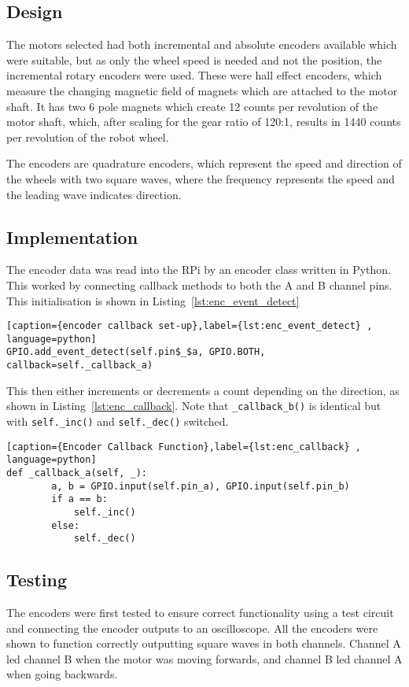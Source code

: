 \subsection{Design}\label{elec/encoder/design}
The motors selected had both incremental and absolute
encoders available which were suitable, but as only the wheel speed is needed and not the position,
the incremental rotary encoders were used. These were hall effect
encoders, which measure the changing magnetic field of magnets which
are attached to the motor shaft. It has two 6 pole magnets
which create 12 counts per revolution of the motor shaft, which, after
scaling for the gear ratio of 120:1, results in 1440 counts per
revolution of the robot wheel.

The encoders are quadrature encoders, which represent the speed and
direction of the wheels with two square waves, where the frequency
represents the speed and the leading wave indicates direction.

\subsection{Implementation}\label{elec/encoder/impl}

The encoder data was read into the RPi by an encoder class written in
Python. This worked by connecting callback methods to both the A and B
channel pins. This initialisation is shown in Listing~\ref{lst:enc_event_detect}

\begin{lstlisting}[caption={encoder callback set-up},label={lst:enc_event_detect} , language=python]
GPIO.add_event_detect(self.pin$_$a, GPIO.BOTH, callback=self._callback_a)
\end{lstlisting}

This then either increments or decrements a count depending on the
direction, as shown in Listing~\ref{lst:enc_callback}. Note that
\verb|_callback_b()| is identical but with \verb|self._inc()| and
\verb|self._dec()| switched.

\begin{lstlisting}[caption={Encoder Callback Function},label={lst:enc_callback} , language=python]
def _callback_a(self, _):
        a, b = GPIO.input(self.pin_a), GPIO.input(self.pin_b)
        if a == b:
            self._inc()
        else:
            self._dec()
\end{lstlisting}


\subsection{Testing}\label{elec/encoder/test}
The encoders were first tested to ensure correct functionality using a test circuit and connecting the encoder outputs to an
oscilloscope. All the encoders were shown to function correctly
outputting square waves in both channels. Channel A led channel B
when the motor was moving forwards, and channel B led channel A when going backwards.

